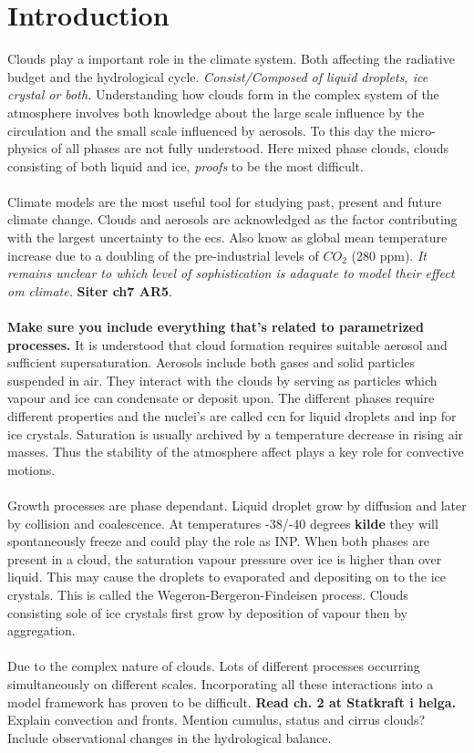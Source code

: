 \chapter{Introduction} \label{ch:introduction}
Clouds play a important role in the climate system. Both affecting the radiative budget and the hydrological cycle. \textit{Consist/Composed of liquid droplets, ice crystal or both.} Understanding how clouds form in the complex system of the atmosphere involves both knowledge about the large scale influence by the circulation and the small scale influenced by aerosols. To this day the micro-physics of all phases are not fully understood. Here mixed phase clouds, clouds consisting of both liquid and ice, \textit{proofs} to be the most difficult. 
\\ \\ 
Climate models are the most useful tool for studying past, present and future climate change. Clouds and aerosols are acknowledged as the factor contributing with the largest uncertainty to the \acrfull{ecs}. Also know as global mean temperature increase due to a doubling of the pre-industrial levels of $CO_2$ (280 \acrshort{ppm}). \textit{It remains unclear to which level of sophistication is adaquate to model their effect om climate.} \textbf{Siter ch7 AR5}.
\\ \\
\textbf{Make sure you include everything that's related to parametrized processes.} It is understood that cloud formation requires suitable aerosol and sufficient supersaturation. Aerosols include both gases and solid particles suspended in air. They interact with the clouds by serving as particles which vapour and ice can condensate or deposit upon. The different phases require different properties and the nuclei's are called \acrshort{ccn} for liquid droplets and \acrshort{inp} for ice crystals. Saturation is usually archived by a temperature decrease in rising air masses. Thus the stability of the atmosphere affect plays a key role for convective motions. 
\\ \\ 
Growth processes are phase dependant. Liquid droplet grow by diffusion and later by collision and coalescence. At temperatures -38/-40 degrees \textbf{kilde} they will spontaneously freeze and could play the role as INP. When both phases are present in a cloud, the saturation vapour pressure over ice is higher than over liquid. This may cause the droplets to evaporated and depositing on to the ice crystals. This is called the Wegeron-Bergeron-Findeisen process. Clouds consisting sole of ice crystals first grow by deposition of vapour then by aggregation. 
\\ \\ 
Due to the complex nature of clouds. Lots of different processes occurring simultaneously on different scales. Incorporating all these interactions into a model framework has proven to be difficult. \textbf{Read ch. 2 at Statkraft i helga.} Explain convection and fronts. Mention cumulus, status and cirrus clouds?
Include observational changes in the hydrological balance. 


